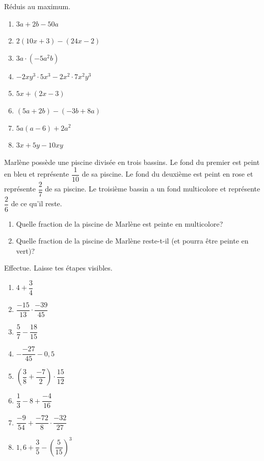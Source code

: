 \documentclass[12pt,parskip=half-, twoside=semi]{scrartcl}
\begin{document}
\begin{exercise}[points=8]
    Réduis au maximum. 
    \begin{enumerate}[cols=2]
        \item $3a + 2b - 50a$
        \item $2(10x+3) - (24x-2)$
        \item $3a \cdot (-5a^2b)$
        \item $-2xy^3 \cdot 5x^3 - 2x^2 \cdot 7x^2y^3$
        \item $5x+(2x-3)$
        \item $(5a+2b)-(-3b+8a)$
        \item $5a(a-6) + 2a^2$
        \item $3x+5y-10xy$
    \end{enumerate}
\end{exercise}

\begin{exercise}[points=4]
    Marlène possède une piscine divisée en trois bassins. Le fond du premier est peint en bleu et représente $\dfrac{1}{10}$ de sa piscine. Le fond du deuxième est peint en rose et représente $\dfrac{2}{7}$ de sa piscine. Le troisième bassin a un fond multicolore et représente $\dfrac{2}{6}$ de ce qu'il reste. 
    \begin{enumerate}
        \item Quelle fraction de la piscine de Marlène est peinte en multicolore? 
        \item Quelle fraction de la piscine de Marlène reste-t-il (et pourra être peinte en vert)? 
    \end{enumerate}
\end{exercise}

\begin{exercise}[points=8]
    Effectue. Laisse tes étapes visibles.
    \begin{enumerate}[cols=2]
        \item $4+\dfrac{3}{4}$
        \item $\dfrac{-15}{13} \cdot \dfrac{-39}{45}$
        \item $\dfrac{5}{7} - \dfrac{18}{15}$
        \item $-\dfrac{-27}{45} - 0,5$
        \item $\left(\dfrac{3}{8} + \dfrac{-7}{2}\right)\cdot \dfrac{15}{12}$
        \item $\dfrac{1}{3}-8+\dfrac{-4}{16}$
        \item $\dfrac{-9}{54} + \dfrac{-72}{8} \cdot \dfrac{-32}{27}$
        \item $1,6 + \dfrac{3}{5} - \left(\dfrac{5}{15}\right)^3$
    \end{enumerate}
\end{exercise}
\end{document}
